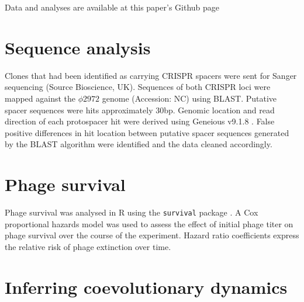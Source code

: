 \documentclass [12pt, a4paper, twoside]  {article}
\begin{document}
Data and analyses are available at this paper's Github page

\section*{Sequence analysis}
Clones that had been identified as carrying CRISPR spacers were sent for Sanger sequencing (Source Bioscience, UK). Sequences of both CRISPR loci were mapped against the $\phi 2972$ genome (Accession: NC) using BLAST. Putative spacer sequences were hits approximately 30bp. Genomic location and read direction of each protospacer hit were derived using Geneious  v9.1.8 \citep{kearse2012geneious}. False positive differences in hit location between putative spacer sequences generated by the BLAST algorithm were identified and the data cleaned accordingly. 

\section*{Phage survival}
Phage survival was analysed in R using the \texttt{survival} package \citep{survival}. A Cox proportional hazards model was used to assess the effect of initial phage titer on phage survival over the course of the experiment. Hazard ratio coefficients express the relative risk of phage extinction over time. 

\section*{Inferring coevolutionary dynamics}


\clearpage

\end{document}
